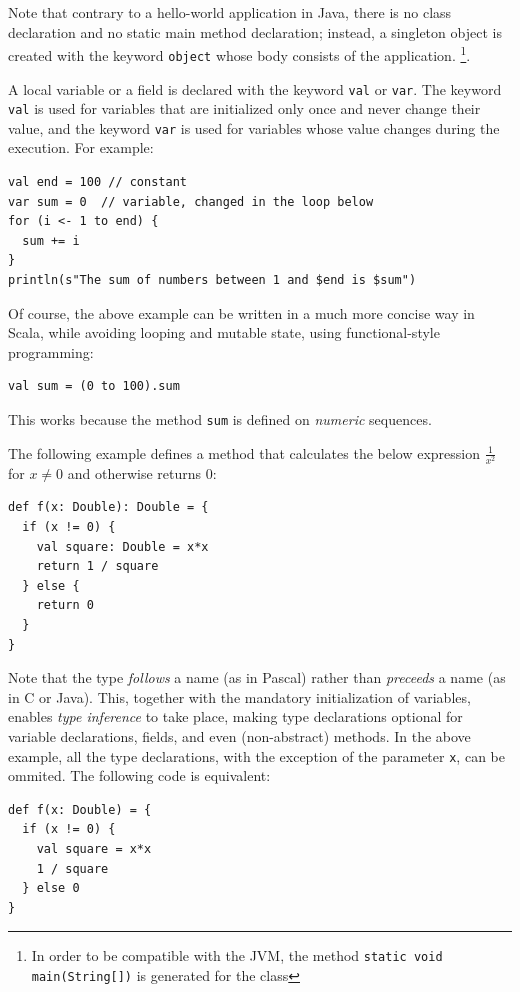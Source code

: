 Note that contrary to a hello-world application in Java, there is no class declaration and no static main method declaration; instead, a singleton object is created with the keyword \texttt{object} whose body consists of the application. \footnote{In order to be compatible with the JVM, the method \texttt{static void main(String[])} is generated for the class}.

A local variable or a field is declared with the keyword \texttt{val} or \texttt{var}. The keyword \texttt{val} is used for variables that are initialized only once and never change their value, and the keyword \texttt{var} is used for variables whose value changes during the execution. For example:

\begin{lstlisting}
val end = 100 // constant
var sum = 0  // variable, changed in the loop below
for (i <- 1 to end) {
  sum += i
}
println(s"The sum of numbers between 1 and $end is $sum")
\end{lstlisting}

Of course, the above example can be written in a much more concise way in Scala, while avoiding looping and mutable state, using functional-style programming:
\begin{lstlisting}
val sum = (0 to 100).sum
\end{lstlisting} 
\noindent This works because the method \texttt{sum} is defined on \emph{numeric} sequences.

\noindent The following example defines a method that calculates the below expression \(\frac{1}{x^2}\) for \(x \neq 0\) and otherwise returns \(0\):

\begin{lstlisting}
def f(x: Double): Double = {
  if (x != 0) {
    val square: Double = x*x
    return 1 / square 
  } else {
    return 0
  }
}
\end{lstlisting}

Note that the type \emph{follows} a name (as in Pascal) rather than \emph{preceeds} a name (as in C or Java). This, together with the mandatory initialization of variables, enables \emph{type inference} to take place, making type declarations optional for variable declarations, fields, and even (non-abstract) methods. In the above example, all the type declarations, with the exception of the parameter \texttt{x}, can be ommited. The following code is equivalent:
\begin{lstlisting}
def f(x: Double) = {
  if (x != 0) {
    val square = x*x
    1 / square 
  } else 0
}
\end{lstlisting}

